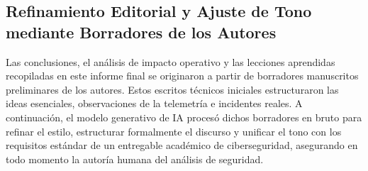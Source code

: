 \subsection*{Refinamiento Editorial y Ajuste de Tono mediante Borradores de los Autores}
Las conclusiones, el análisis de impacto operativo y las lecciones aprendidas recopiladas en este informe final se originaron a partir de borradores manuscritos preliminares de los autores. Estos escritos técnicos iniciales estructuraron las ideas esenciales, observaciones de la telemetría e incidentes reales. A continuación, el modelo generativo de IA procesó dichos borradores en bruto para refinar el estilo, estructurar formalmente el discurso y unificar el tono con los requisitos estándar de un entregable académico de ciberseguridad, asegurando en todo momento la autoría humana del análisis de seguridad.




